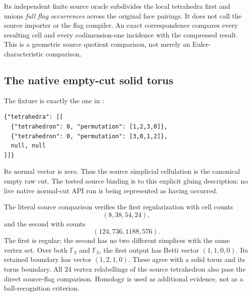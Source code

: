 \documentclass[11pt]{article}
\theoremstyle{definition}\newtheorem{definition}[theorem]{Definition}
\theoremstyle{remark}\newtheorem{remark}[theorem]{Remark}
\newcommand{\F}{\mathbb F}
\begin{document}
Its independent finite source oracle subdivides the local tetrahedra first and unions \emph{full flag occurrences} across the original face pairings. It does not call the source importer or the flag compiler. An exact correspondence compares every resulting cell and every codimension-one incidence with the compressed result. This is a geometric source quotient comparison, not merely an Euler-characteristic comparison.

\subsection{The native empty-cut solid torus}
The fixture is exactly the one in \cite{fixture}:
\begin{verbatim}
{"tetrahedra": [[
  {"tetrahedron": 0, "permutation": [1,2,3,0]},
  {"tetrahedron": 0, "permutation": [3,0,1,2]},
  null, null
]]}
\end{verbatim}
Its normal vector is zero. Thus the source simplicial cellulation is the canonical empty raw cut. The tested source binding is to this explicit gluing description; no live native normal-cut API run is being represented as having occurred.

The literal source comparison verifies the first regularization with cell counts
\[
                          (8,38,54,24),
\]
and the second with counts
\[
                          (124,736,1188,576).
\]
The first is regular; the second has no two different simplices with the same vertex set. Over both \(\F_2\) and \(\F_3\), the first output has Betti vector \((1,1,0,0)\). Its retained boundary has vector \((1,2,1,0)\). These agree with a solid torus and its torus boundary. All 24 vertex relabellings of the source tetrahedron also pass the direct source-flag comparison. Homology is used as additional evidence, not as a ball-recognition criterion.
\end{document}
